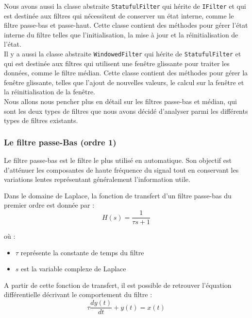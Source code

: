 Nous avons aussi la classe abstraite \texttt{StatufulFilter} qui hérite de \texttt{IFilter} et qui est destinée 
aux filtres qui nécessitent de conserver un état interne, comme le filtre passe-bas et passe-haut. 
Cette classe contient des méthodes pour gérer l'état interne du filtre telles que l'initialisation, la mise à jour 
et la réinitialisation de l'état. \\

Il y a aussi la classe abstraite \texttt{WindowedFilter} qui hérite de \texttt{StatufulFilter} et qui est destinée 
aux filtres qui utilisent une fenêtre glissante pour traiter les données, comme le filtre médian. 
Cette classe contient des méthodes pour gérer la fenêtre glissante, telles que l'ajout de nouvelles valeurs, le
calcul sur la fenêtre et la réinitialisation de la fenêtre. \\

Nous allons nous pencher plus en détail sur les filtres passe-bas et médian, qui sont les deux types de filtres que nous avons décidé d'analyser 
parmi les différents types de filtres existants.

\subsubsection{Le filtre passe-Bas (ordre 1)}
\label{sec:filtre_passe_bas}

Le filtre passe-bas est le filtre le plus utilisé en automatique. Son objectif est d'atténuer les composantes de haute fréquence du signal tout en conservant les variations lentes représentant généralement l'information utile.

Dans le domaine de Laplace, la fonction de transfert d'un filtre passe-bas du premier ordre est donnée par :
\begin{equation}
    H(s) = \frac{1}{\tau s + 1}
\end{equation}

où : 
\begin{itemize}
    \item $\tau$ représente la constante de temps du filtre
    \item $s$ est la variable complexe de Laplace
\end{itemize}

A partir de cette fonction de transfert, il est possible de retrouver l'équation différentielle décrivant le comportement du filtre :
\begin{equation}
    \tau \frac{dy(t)}{dt} + y(t) = x(t)
\end{equation}

